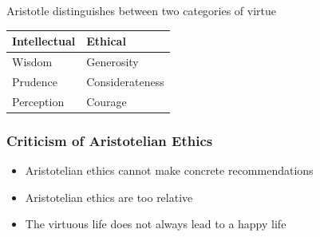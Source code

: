 \documentclass[11pt]{article}
\theoremstyle{definition}
\begin{document}
Aristotle distinguishes between two categories of virtue
\begin{tabularx}{\linewidth}{l @{\hskip 2cm} l}
	\textbf{Intellectual} & \textbf{Ethical}\\
	\hline
	Wisdom & Generosity \\
	Prudence & Considerateness \\
	Perception & Courage \\
\end{tabularx}

\subsubsection{Criticism of Aristotelian Ethics}
\begin{itemize}[label=-]
	\item Aristotelian ethics cannot make concrete recommendations
	\item Aristotelian ethics are too relative
	\item The virtuous life does not always lead to a happy life
\end{itemize}
\end{document}
